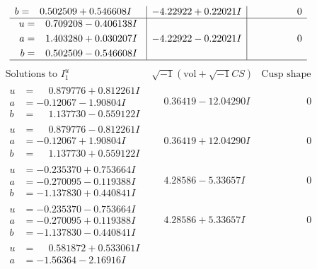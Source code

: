 \documentclass[1p]{elsarticle_modified}
\theoremstyle{definition}
\newcommand{\I}{\sqrt{-1}}
\begin{document}
$$\begin{array}{c|c|c}
\begin{aligned}
b &= \phantom{-}0.502509 + 0.546608 I\end{aligned}
 & -4.22922 + 0.22021 I & \phantom{-0.000000 } 0 \\ \hline\begin{aligned}
u &= \phantom{-}0.709208 - 0.406138 I \\
a &= \phantom{-}1.403280 + 0.030207 I \\
b &= \phantom{-}0.502509 - 0.546608 I\end{aligned}
 & -4.22922 - 0.22021 I & \phantom{-0.000000 } 0\\
 \hline 
 \end{array}$$\newpage$$\begin{array}{c|c|c}  
\text{Solutions to }I^u_{1}& \I (\text{vol} + \sqrt{-1}CS) & \text{Cusp shape}\\
 \hline 
\begin{aligned}
u &= \phantom{-}0.879776 + 0.812261 I \\
a &= -0.12067 - 1.90804 I \\
b &= \phantom{-}1.137730 - 0.559122 I\end{aligned}
 & \phantom{-}0.36419 - 12.04290 I & \phantom{-0.000000 } 0 \\ \hline\begin{aligned}
u &= \phantom{-}0.879776 - 0.812261 I \\
a &= -0.12067 + 1.90804 I \\
b &= \phantom{-}1.137730 + 0.559122 I\end{aligned}
 & \phantom{-}0.36419 + 12.04290 I & \phantom{-0.000000 } 0 \\ \hline\begin{aligned}
u &= -0.235370 + 0.753664 I \\
a &= -0.270095 - 0.119388 I \\
b &= -1.137830 + 0.440841 I\end{aligned}
 & \phantom{-}4.28586 - 5.33657 I & \phantom{-0.000000 } 0 \\ \hline\begin{aligned}
u &= -0.235370 - 0.753664 I \\
a &= -0.270095 + 0.119388 I \\
b &= -1.137830 - 0.440841 I\end{aligned}
 & \phantom{-}4.28586 + 5.33657 I & \phantom{-0.000000 } 0 \\ \hline\begin{aligned}
u &= \phantom{-}0.581872 + 0.533061 I \\
a &= -1.56364 - 2.16916 I \\

\end{aligned}
\end{array}$$
\end{document}
